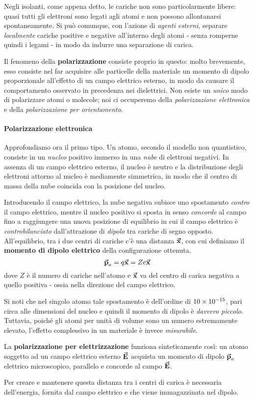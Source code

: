 Negli isolanti, come appena detto, le cariche non sono particolarmente libere: quasi tutti gli elettroni sono legati agli atomi e non possono allontanarsi spontaneamente. Si può comunque, con l'azione di \textit{agenti esterni}, separare \textit{localmente} cariche positive e negative all'interno degli atomi - senza romperne quindi i legami - in modo da indurre una separazione di carica.

Il fenomeno della \textbf{polarizzazione} consiste proprio in questo: molto brevemente, esso consiste nel far acquisire alle particelle della materiale un momento di dipolo proporzionale all'effetto di un campo elettrico esterno, in modo da causare il comportamento osservato in precedenza nei dielettrici. Non esiste un \textit{unico} modo di polarizzare atomi o molecole; noi ci occuperemo della \textit{polarizzazione elettronica} e della \textit{polarizzazione per orientamento}.
\paragraph{Polarizzazione elettronica}
Approfondiamo ora il primo tipo. Un atomo, secondo il modello non quantistico, consiste in un \textit{nucleo} positivo immerso in una \textit{nube} di elettroni negativi. In assenza di un campo elettrico esterno, il nucleo è neutro e la distribuzione degli elettroni attorno al nucleo è mediamente simmetrica, in modo che il centro di massa della nube coincida con la posizione del nucleo.

Introducendo il campo elettrico, la nube negativa subisce uno spostamento \textit{contro} il campo elettrico, mentre il nucleo positivo si sposta in senso \textit{concorde} al campo fino a raggiungere una nuova posizione di equilibrio in cui il campo elettrico è \textit{controbilanciato} dall'attrazione di \textit{dipolo} tra cariche di segno opposto.
All'equilibrio, tra i due centri di cariche c'è una distanza $\vb*{\va{x}}$, con cui definiamo il \textbf{momento di dipolo elettrico} della configurazione ottenuta.
\begin{equation}
	\vb*{\va{p}}_a=q\vb*{\va{x}}=Ze\vb*{\va{x}}
\end{equation}
dove $Z$ è il numero di cariche nell'atomo e $\vb*{\va{x}}$ va del centro di carica negativa a quello positiva - ossia nella direzione del campo elettrico.
\begin{observe}
	Si noti che nel singolo atomo tale spostamento è dell'ordine di $\num{10d-15}$, pari circa alle dimensioni del nucleo e quindi il momento di dipolo è \textit{davvero piccolo}. Tuttavia, poiché gli atomi per unità di volume sono un numero estremamente elevato, l'effetto complessivo in un materiale è invece \textit{misurabile}.
\end{observe}
La \textbf{polarizzazione per elettrizzazione} funziona sinteticamente così: un atomo soggetto ad un campo elettrico esterno $\vb*{\va{E}}$ acquista un momento di dipolo $\vb*{\va{p}}_a$ elettrico microscopico, parallelo e concorde al campo $\vb*{\va{E}}$.
\begin{observe}
	Per creare e mantenere questa distanza tra i centri di carica è necessaria dell'energia, fornita dal campo elettrico e che viene immagazzinata nel dipolo.
\end{observe}
